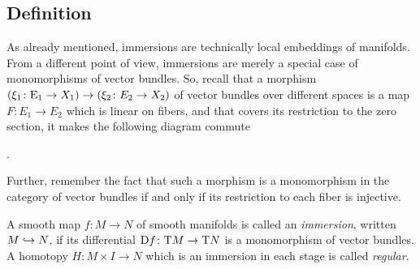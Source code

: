 \subsection{Definition}
As already mentioned, immersions are technically local embeddings of
manifolds.
From a different point of view, immersions are merely a special case
of monomorphisms of vector bundles. So, recall that a morphism
$(\xi_1\colon\mathrm{E}_1\to X_1)\to(\xi_2\colon E_2\to X_2)$ 
of vector bundles over different spaces is a map $F\colon E_1\to E_2$
which is linear on fibers, and that covers its restriction to the zero
section, \idest it makes the following diagram commute
\begin{center}
  .
\end{center}
Further, remember the fact that such a morphism is a monomorphism in
the category of vector bundles if and only if its restriction to each
fiber is injective.
\begin{Def}
  A smooth map $f\colon M\to N$ of smooth manifolds is called
  an \emph{immersion}, written $M\hookrightarrow N$, if its differential
  $\mathrm{D} f\colon\mathrm{T}M\to\mathrm{T}N$ is a monomorphism of vector
  bundles.
  A homotopy $H\colon M\times I\to N$ which is an immersion in each
  stage is called \emph{regular}.
\end{Def}
